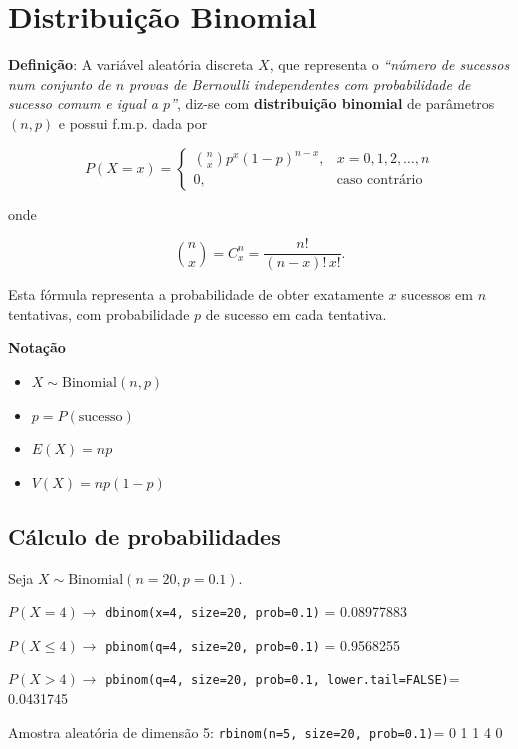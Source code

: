 \documentclass[
]{book}
\providecommand{\tightlist}{%
  \setlength{\itemsep}{0pt}\setlength{\parskip}{0pt}}
\begin{document}
\section{Distribuição Binomial}\label{distribuiuxe7uxe3o-binomial}

\textbf{Definição}: A variável aleatória discreta \(X\), que representa o \emph{``número de sucessos num conjunto de \(n\) provas de Bernoulli independentes com probabilidade de sucesso comum e igual a \(p\)''}, diz-se com \textbf{distribuição binomial} de parâmetros \((n, p)\) e possui f.m.p. dada por

\[
P(X = x) = 
\begin{cases} 
\binom{n}{x} p^x (1 - p)^{n - x}, & x = 0, 1, 2, \ldots, n \\ 
0, & \text{caso contrário}
\end{cases}
\]

onde

\[
\binom{n}{x} = C_x^n = \frac{n!}{(n - x)! \, x!}.
\]

Esta fórmula representa a probabilidade de obter exatamente \(x\) sucessos em \(n\) tentativas, com probabilidade \(p\) de sucesso em cada tentativa.

\textbf{Notação}

\begin{itemize}
\tightlist
\item
  \(X \sim \text{Binomial}(n,p)\)
\item
  \(p = P(\text{sucesso})\)
\item
  \(E(X) = np\)
\item
  \(V(X) = np(1-p)\)
\end{itemize}

\subsection{Cálculo de probabilidades}\label{cuxe1lculo-de-probabilidades-1}

Seja \(X\sim\text{Binomial}(n=20, p=0.1)\).

\(P(X = 4) \to\) \texttt{dbinom(x=4,\ size=20,\ prob=0.1)} = 0.08977883

\noindent \(P(X\leq 4) \to\) \texttt{pbinom(q=4,\ size=20,\ prob=0.1)} = 0.9568255

\noindent \(P(X > 4)\to\)
\texttt{pbinom(q=4,\ size=20,\ prob=0.1,\ lower.tail=FALSE)}= 0.0431745

\noindent Amostra aleatória de dimensão 5: \texttt{rbinom(n=5,\ size=20,\ prob=0.1)}= 0 1 1 4 0
\end{document}
